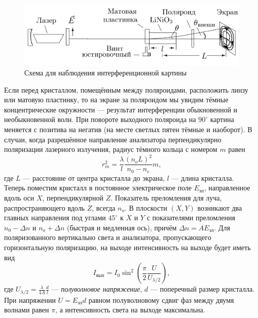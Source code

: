 \documentclass[a4paper, 12pt]{article}
\begin{document}
\begin{figure}[H]
\begin{center}
    \includegraphics[width=1\linewidth]{1.png}
\end{center}
\caption{Схема для наблюдения интерференционной картины}
\label{fig:scheme_interfer}
\end{figure}

Если перед кристаллом, помещённым между поляроидами, расположить линзу или матовую пластинку, то на экране за поляроидом мы увидим тёмные концентрические окружности --- результат интерференции обыкновенной и необыкновенной волн. При повороте выходного поляроида на $90^\circ$ картина меняется с позитива на негатив (на месте светлых пятен тёмные и наоборот). В случаи, когда разрешённое направление анализатора перпендикулярно поляризации лазерного излучения, радиус тёмного кольца с номером $m$ равен
\begin{equation}\label{eq:2-luch}
r_m^2 = \dfrac{\lambda}{l} \dfrac{(n_oL)^2}{n_0 - n_e}m,
\end{equation}
где $L$ --- расстояние от центра кристалла до экрана, $l$ --- длина кристалла.\\
Теперь поместим кристалл в постоянное электрическое поле $E_{\text{эл}}$, направленное вдоль оси $X$, перпендикулярной $Z$. Показатель преломления для луча, распространяющего вдоль $Z$, всегда $n_o$. В плоскости $(X,Y)$ возникают два главных направления под углами $45^\circ$ к $X$ и $Y$ с показателями преломления $n_0 - \Delta n$ и $n_o + \Delta n$ (быстрая и медленная ось), причём $\Delta n = A E_{\text{эл}}$. Для поляризованного вертикально света и анализатора, пропускающего горизонтальную поляризацию, на выходе интенсивность на выходе будет иметь вид
\begin{equation}
I_{\text{вых}} = I_0 \sin^2 \left(\dfrac{\pi}{2} \dfrac{U}{U_{\lambda/2}} \right),
\end{equation}
где $U_{\lambda/2} = \frac{\lambda}{4A}\frac{d}{l}$ --- \textit{полуволновое напряжение}, $d$ --- поперечный размер кристалла.  При напряжении $U = E_{\text{эл}}d$ равном полуволновому сдвиг фаз между двумя волнами равен $\pi$, а интенсивность света на выходе максимальна. 
\end{document}
